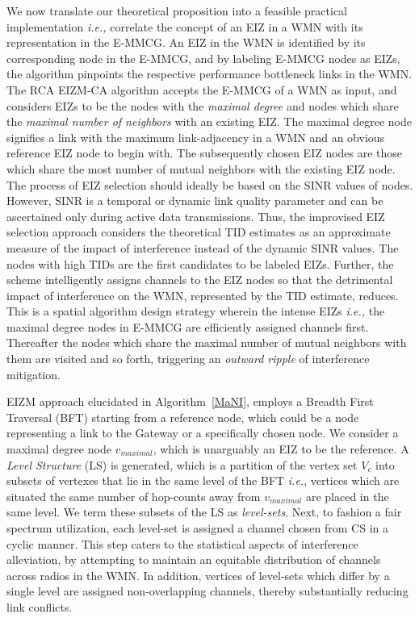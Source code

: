 \documentclass[conference]{IEEEtran}
\begin{document}
We now translate our theoretical proposition into a feasible practical implementation \emph{i.e.,} correlate the concept of an EIZ in a WMN with its representation in the E-MMCG. An EIZ in the WMN is identified by its corresponding node in the E-MMCG, and by labeling E-MMCG nodes as EIZs, the algorithm pinpoints the respective performance bottleneck links in the WMN. The RCA EIZM-CA algorithm accepts the E-MMCG of a WMN as input, and considers EIZs to be the nodes with the \textit{maximal degree} and nodes which share the \textit{maximal number of neighbors} with an existing EIZ. The maximal degree node signifies a link with the maximum link-adjacency in a WMN and an obvious reference EIZ node to begin with. The subsequently chosen EIZ nodes are those which share the most number of mutual neighbors with the existing EIZ node. The process of EIZ selection should ideally be based on the SINR values of nodes. However, SINR is a temporal or dynamic link quality parameter and can be ascertained only during active 
data transmissions. Thus, the improvised EIZ selection approach considers the theoretical TID estimates as an approximate measure of the impact of interference instead of the dynamic SINR values. The nodes with high TIDs are the first candidates to be labeled EIZs. Further, the scheme intelligently assigns channels to the EIZ nodes so that the detrimental impact of interference on the WMN, represented by the TID estimate, reduces. This is a spatial algorithm design strategy wherein the intense EIZs \emph{i.e.,} the maximal degree nodes in E-MMCG are efficiently assigned channels first. Thereafter the nodes which share the maximal number of mutual neighbors with them are visited and so forth, triggering an \textit{outward ripple} of interference mitigation.

EIZM approach elucidated in Algorithm~\ref{MaNI}, employs a Breadth First Traversal (BFT) starting from a reference node, which could be a node representing a link to the Gateway or a specifically chosen node. We consider a maximal degree node $v_{maximal}$, which is unarguably an EIZ to be the reference. A \textit{Level Structure} (LS) is generated, which is a partition of the vertex set $V_c$ into subsets of vertexes that lie in the same level of the BFT \emph{i.e.}, vertices which are situated the same number of hop-counts away from $v_{maximal}$ are placed in the same level. We term these subsets of the LS as \textit{level-sets}. Next, to fashion a fair spectrum utilization, each level-set is assigned a channel chosen from CS  in a cyclic manner. This step caters to the statistical aspects of interference alleviation, by attempting to maintain an equitable distribution of channels across radios in the WMN. In addition, vertices of level-sets which differ by a single level are assigned non-overlapping 
channels, thereby substantially reducing link conflicts.
\end{document}
